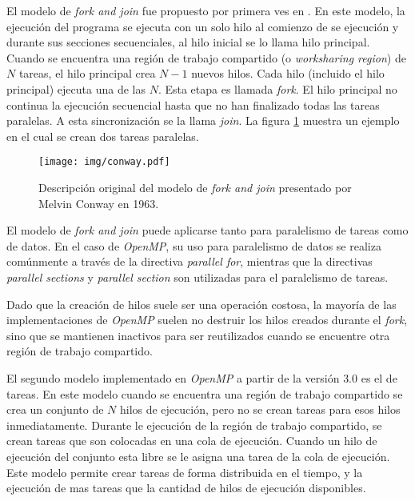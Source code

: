 El modelo de \emph{fork and join} fue propuesto por primera ves en
\cite{conway1963}. En este modelo, la ejecución del programa se ejecuta con un
solo hilo al comienzo de se ejecución y durante sus secciones secuenciales, al
hilo inicial se lo llama hilo principal. Cuando se encuentra una región de
trabajo compartido (o \emph{worksharing region}) de $N$ tareas, el hilo
principal crea $N-1$ nuevos hilos. Cada hilo (incluido el hilo principal)
ejecuta una de las $N$. Esta etapa es llamada \emph{fork}. El hilo principal no
continua la ejecución secuencial hasta que no han finalizado todas las tareas
paralelas. A esta sincronización se la llama \emph{join}. La figura \ref{conway}
muestra un ejemplo en el cual se crean dos tareas paralelas.

\begin{figure}[!h]

	\centering

	\texttt{[image: img/conway.pdf]}

	\caption{Descripción original del modelo de \emph{fork and join}
	presentado por Melvin Conway en 1963\cite{conway1963}.}

	\label{conway}

\end{figure}

El modelo de \emph{fork and join} puede aplicarse tanto para paralelismo de
tareas como de datos. En el caso de \emph{OpenMP}, su uso para paralelismo de
datos se realiza comúnmente a través de la directiva \emph{parallel for},
mientras que la directivas \emph{parallel sections} y \emph{parallel section}
son utilizadas para el paralelismo de tareas.

Dado que la creación de hilos suele ser una operación costosa, la mayoría de las
implementaciones de \emph{OpenMP} suelen no destruir los hilos creados durante
el \emph{fork}, sino que se mantienen inactivos para ser reutilizados cuando se
encuentre otra región de trabajo compartido.

El segundo modelo implementado en \emph{OpenMP} a partir de la versión $3.0$ es
el de tareas. En este modelo cuando se encuentra una región de trabajo
compartido se crea un conjunto de $N$ hilos de ejecución, pero no se crean
tareas para esos hilos inmediatamente. Durante le ejecución de la región de
trabajo compartido, se crean tareas que son colocadas en una cola de ejecución.
Cuando un hilo de ejecución del conjunto esta libre se le asigna una tarea de la
cola de ejecución. Este modelo permite crear tareas de forma distribuida en el
tiempo, y la ejecución de mas tareas que la cantidad de hilos de ejecución
disponibles.

